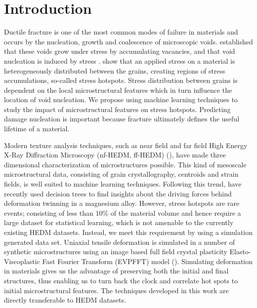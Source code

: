 \documentclass[preprint,1p,times,authoryear]{elsarticle}%
\begin{document}

\section{Introduction}
Ductile fracture is one of the most common modes of failure in materials and occurs by the nucleation, growth and coalescence of microscopic voids. \cite{Rimmer1959} established that these voids grow under stress by accumulating vacancies, and that void nucleation is induced by stress . \cite{Qidwai2009} show that an applied stress on a material is heterogeneously distributed between the grains, creating regions of stress accumulations, so-called stress hotspots.  Stress distribution between grains is dependent on the local microstructural features which in turn influence the location of void nucleation. We propose using machine learning techniques to study the impact of microstructural features on stress hotspots. Predicting damage nucleation is important because fracture ultimately defines the useful lifetime of a material.%

Modern texture analysis techniques, such as near field and far field High Energy X-Ray Diffraction Microscopy (nf-HEDM, ff-HEDM) (\cite{Lienert2011}), have made three dimensional characterization of microstructures possible. This kind of mesoscale microstructural data, consisting of grain crystallography, centroids and strain fields, is well suited to machine learning techniques. Following this trend, \cite{Orme2016} have recently used decision trees to find insights about the driving forces behind deformation twinning in a magnesium alloy. However, stress hotspots are rare events; consisting of less than 10\% of the material volume and hence require a large dataset for statistical learning, which is not amenable to the currently existing HEDM datasets. Instead, we meet this requirement by using a simulation generated data set. Uniaxial tensile deformation is simulated in a number of synthetic microstructures using an image based full field crystal plasticity Elasto-Viscoplastic Fast Fourier Transform (EVPFFT) model (\cite{Lebensohn2012}).  Simulating deformation in materials gives us the advantage of preserving both the initial and final structures, thus enabling us to turn back the clock and correlate hot spots to initial microstructural features. The techniques developed in this work are directly transferable to HEDM datasets.
\end{document}
